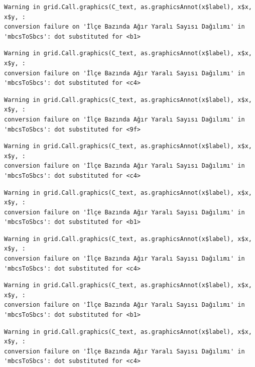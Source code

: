\documentclass[
  11pt,
  a4paper,
  DIV=11,
  numbers=noendperiod]{scrartcl}
\begin{document}
\begin{verbatim}
Warning in grid.Call.graphics(C_text, as.graphicsAnnot(x$label), x$x, x$y, :
conversion failure on 'İlçe Bazında Ağır Yaralı Sayısı Dağılımı' in
'mbcsToSbcs': dot substituted for <b1>
\end{verbatim}

\begin{verbatim}
Warning in grid.Call.graphics(C_text, as.graphicsAnnot(x$label), x$x, x$y, :
conversion failure on 'İlçe Bazında Ağır Yaralı Sayısı Dağılımı' in
'mbcsToSbcs': dot substituted for <c4>
\end{verbatim}

\begin{verbatim}
Warning in grid.Call.graphics(C_text, as.graphicsAnnot(x$label), x$x, x$y, :
conversion failure on 'İlçe Bazında Ağır Yaralı Sayısı Dağılımı' in
'mbcsToSbcs': dot substituted for <9f>
\end{verbatim}

\begin{verbatim}
Warning in grid.Call.graphics(C_text, as.graphicsAnnot(x$label), x$x, x$y, :
conversion failure on 'İlçe Bazında Ağır Yaralı Sayısı Dağılımı' in
'mbcsToSbcs': dot substituted for <c4>
\end{verbatim}

\begin{verbatim}
Warning in grid.Call.graphics(C_text, as.graphicsAnnot(x$label), x$x, x$y, :
conversion failure on 'İlçe Bazında Ağır Yaralı Sayısı Dağılımı' in
'mbcsToSbcs': dot substituted for <b1>
\end{verbatim}

\begin{verbatim}
Warning in grid.Call.graphics(C_text, as.graphicsAnnot(x$label), x$x, x$y, :
conversion failure on 'İlçe Bazında Ağır Yaralı Sayısı Dağılımı' in
'mbcsToSbcs': dot substituted for <c4>
\end{verbatim}

\begin{verbatim}
Warning in grid.Call.graphics(C_text, as.graphicsAnnot(x$label), x$x, x$y, :
conversion failure on 'İlçe Bazında Ağır Yaralı Sayısı Dağılımı' in
'mbcsToSbcs': dot substituted for <b1>
\end{verbatim}

\begin{verbatim}
Warning in grid.Call.graphics(C_text, as.graphicsAnnot(x$label), x$x, x$y, :
conversion failure on 'İlçe Bazında Ağır Yaralı Sayısı Dağılımı' in
'mbcsToSbcs': dot substituted for <c4>
\end{verbatim}
\end{document}
